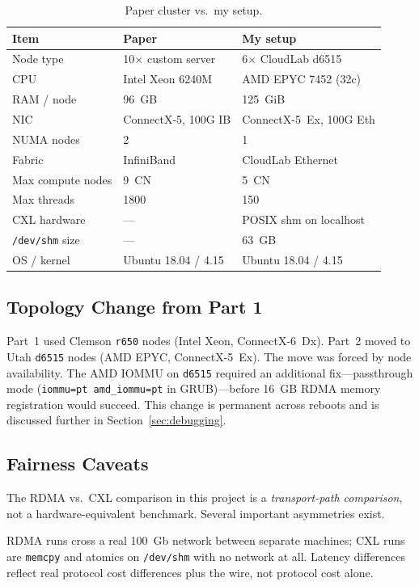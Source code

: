 \documentclass[10pt,twocolumn]{article}
\begin{document}
\begin{table}[H]
\centering
\footnotesize
\caption{Paper cluster vs.\ my setup.}
\label{tab:setup}
\begin{tabular}{lll}
\toprule
Item & Paper & My setup \\
\midrule
Node type & 10$\times$ custom server & 6$\times$ CloudLab d6515 \\
CPU & Intel Xeon 6240M & AMD EPYC 7452 (32c) \\
RAM / node & 96~GB & 125~GiB \\
NIC & ConnectX-5, 100G IB & ConnectX-5~Ex, 100G Eth \\
NUMA nodes & 2 & 1 \\
Fabric & InfiniBand & CloudLab Ethernet \\
Max compute nodes & 9~CN & 5~CN \\
Max threads & 1800 & 150 \\
CXL hardware & --- & POSIX shm on localhost \\
\texttt{/dev/shm} size & --- & 63~GB \\
OS / kernel & Ubuntu 18.04 / 4.15 & Ubuntu 18.04 / 4.15 \\
\bottomrule
\end{tabular}
\end{table}

\subsection{Topology Change from Part 1}

Part~1 used Clemson \texttt{r650} nodes (Intel Xeon, ConnectX-6~Dx).
Part~2 moved to Utah \texttt{d6515} nodes (AMD EPYC, ConnectX-5~Ex).
The move was forced by node availability.
The AMD IOMMU on \texttt{d6515} required an additional fix---passthrough mode
(\texttt{iommu=pt amd\_iommu=pt} in GRUB)---before 16~GB RDMA memory
registration would succeed.
This change is permanent across reboots and is discussed further in
Section~\ref{sec:debugging}.

\subsection{Fairness Caveats}

The RDMA vs.\ CXL comparison in this project is a \emph{transport-path
comparison}, not a hardware-equivalent benchmark.
Several important asymmetries exist.

RDMA runs cross a real 100~Gb network between separate machines; CXL runs are
\texttt{memcpy} and atomics on \texttt{/dev/shm} with no network at all.
Latency differences reflect real protocol cost differences plus the wire, not
protocol cost alone.
\end{document}
